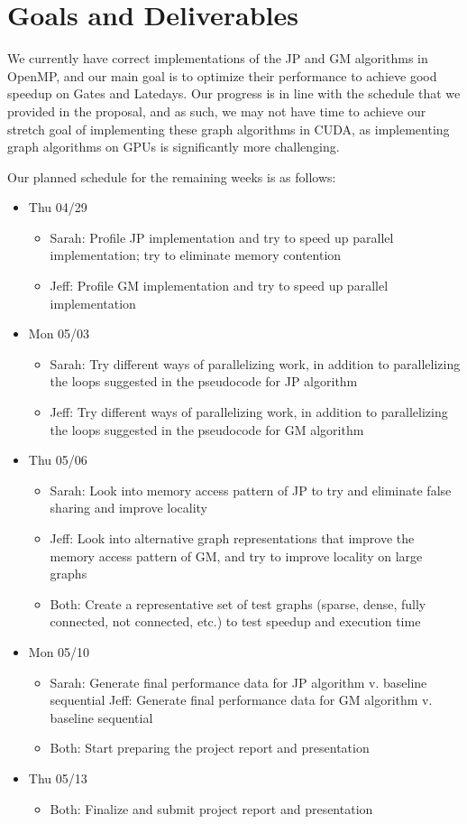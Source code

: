 \documentclass[11pt]{article}
\newcommand{\qlistb}[1] {\begin{itemize}[label=\textbullet~] #1 \end{itemize}}
\begin{document}
\section{Goals and Deliverables}
We currently have correct implementations of the JP and GM algorithms in OpenMP, and our main goal is to optimize their performance to achieve good speedup on Gates and Latedays. Our progress is in line with the schedule that we provided in the proposal, and as such, we may not have time to achieve our stretch goal of implementing these graph algorithms in CUDA, as implementing graph algorithms on GPUs is significantly more challenging.

Our planned schedule for the remaining weeks is as follows:
\qlistb{
	\item Thu 04/29
	\qlistb{
		\item Sarah: Profile JP implementation and try to speed up parallel implementation; try to eliminate memory contention
		\item Jeff: Profile GM implementation and try to speed up parallel implementation
	}
	\item Mon 05/03
	\qlistb{
		\item Sarah: Try different ways of parallelizing work, in addition to parallelizing the loops suggested in the pseudocode for JP algorithm
		\item Jeff: Try different ways of parallelizing work, in addition to parallelizing the loops suggested in the pseudocode for GM algorithm
	}
	\item Thu 05/06
	\qlistb{
		\item Sarah: Look into memory access pattern of JP to try and eliminate false sharing and improve locality
		\item Jeff: Look into alternative graph representations that improve the memory access pattern of GM, and try to improve locality on large graphs
		\item Both: Create a representative set of test graphs (sparse, dense, fully connected, not connected, etc.) to test speedup and execution time
	}
	\item Mon 05/10
	\qlistb{
		\item Sarah: Generate final performance data for JP algorithm v. baseline sequential
		Jeff: Generate final performance data for GM algorithm v. baseline sequential
		\item Both: Start preparing the project report and presentation
	}
	\item Thu 05/13
	\qlistb{
		\item Both: Finalize and submit project report and presentation
	}
}
\end{document}
